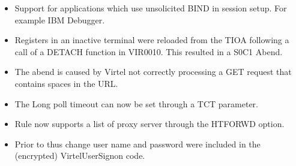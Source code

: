 \documentclass[letterpaper,10pt,english]{sphinxmanual}
\begin{document}
\sphinxAtStartPar
{}
\begin{itemize}
\item {} 
\sphinxAtStartPar
Support for applications which use unsolicited BIND in session setup. For example IBM Debugger.

\end{itemize}

\sphinxAtStartPar
{}
\begin{itemize}
\item {} 
\sphinxAtStartPar
Registers in an inactive terminal were reloaded from the TIOA following a call of a DETACH function in VIR0010. This resulted in a S0C1 Abend.

\end{itemize}

\sphinxAtStartPar
{}
\begin{itemize}
\item {} 
\sphinxAtStartPar
The abend is caused by Virtel not correctly processing a GET request that contains spaces in the URL.

\end{itemize}

\sphinxAtStartPar
{}
\begin{itemize}
\item {} 
\sphinxAtStartPar
The Long poll timeout can now be set through a TCT parameter.

\end{itemize}

\sphinxAtStartPar
{}
\begin{itemize}
\item {} 
\sphinxAtStartPar
Rule now supports a list of proxy server through the HTFORWD option.

\end{itemize}

\sphinxAtStartPar
{}
\begin{itemize}
\item {} 
\sphinxAtStartPar
Prior to thus change user name and password were included in the (encrypted) VirtelUserSignon code.

\end{itemize}
\end{document}
